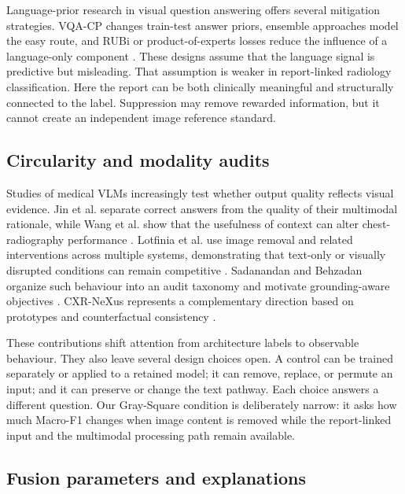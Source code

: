 \documentclass[10pt,a4paper,twocolumn]{article}
\begin{document}
Language-prior research in visual question answering offers several mitigation
strategies. VQA-CP changes train-test answer priors, ensemble approaches model
the easy route, and RUBi or product-of-experts losses reduce the influence of a
language-only component \cite{agrawal2018dontassume,clark2019easyway,
cadene2019rubi}. These designs assume that the language signal is predictive but
misleading. That assumption is weaker in report-linked radiology
classification. Here the report can be both clinically meaningful and
structurally connected to the label. Suppression may remove rewarded
information, but it cannot create an independent image reference standard.

\subsection{Circularity and modality audits}

Studies of medical VLMs increasingly test whether output quality reflects
visual evidence. Jin et al. separate correct answers from the quality of their
multimodal rationale, while Wang et al. show that the usefulness of context can
alter chest-radiography performance
\cite{jin2024hiddenflaws,wang2026clinicalcontext}. Lotfinia et al. use image
removal and related interventions across multiple systems, demonstrating that
text-only or visually disrupted conditions can remain competitive
\cite{lotfinia2026needimage}. Sadanandan and Behzadan organize such behaviour
into an audit taxonomy and motivate grounding-aware objectives
\cite{sadanandan2026consistentdangerous}. CXR-NeXus represents a complementary
direction based on prototypes and counterfactual consistency
\cite{chiang2026cxrnexus}.

These contributions shift attention from architecture labels to observable
behaviour. They also leave several design choices open. A control can be trained
separately or applied to a retained model; it can remove, replace, or permute an
input; and it can preserve or change the text pathway. Each choice answers a
different question. Our Gray-Square condition is deliberately narrow: it asks
how much Macro-F1 changes when image content is removed while the report-linked
input and the multimodal processing path remain available.

\subsection{Fusion parameters and explanations}
\end{document}
